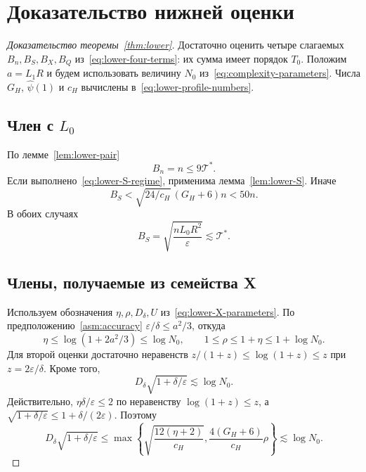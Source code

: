 \section{Доказательство нижней оценки}\label{app:lower-constants}

\begin{proof}[Доказательство теоремы~\ref{thm:lower}]
Достаточно оценить четыре слагаемых $B_n,B_S,B_X,B_Q$
из~\eqref{eq:lower-four-terms}: их сумма имеет порядок $T_0$.
Положим $a=L_1R$ и будем использовать величину $N_0$ из~\eqref{eq:complexity-parameters}.
Числа $G_H$, $\widehat\psi(1)$ и $c_H$ вычислены
в~\eqref{eq:lower-profile-numbers}.

\subsection{Член с \texorpdfstring{$L_0$}{L0}}
По лемме~\ref{lem:lower-pair}
\begin{equation}\label{eq:lower-n-number}
 B_n=n\le9\mathcal T^\ast.
\end{equation}
Если выполнено~\eqref{eq:lower-S-regime}, применима
лемма~\ref{lem:lower-S}. Иначе
\[
 B_S<\sqrt{24/c_H}\,(G_H+6)n<50n.
\]
В обоих случаях
\begin{equation}\label{eq:lower-S-number}
 B_S=\sqrt{\frac{nL_0R^2}{\varepsilon}}\lesssim\mathcal T^\ast.
\end{equation}

\subsection{Члены, получаемые из семейства X}
Используем обозначения $\eta,\rho,D_\delta,U$ из~\eqref{eq:lower-X-parameters}.
По предположению~\ref{asm:accuracy}
$\varepsilon/\delta\le a^2/3$, откуда
\begin{equation}\label{eq:lower-rho-number}
 \eta\le\log(1+2a^2/3)\le\log N_0,\qquad
 1\le\rho\le1+\eta\le1+\log N_0.
\end{equation}
Для второй оценки достаточно неравенств
$z/(1+z)\le\log(1+z)\le z$ при $z=2\varepsilon/\delta$.
Кроме того,
\begin{equation}\label{eq:lower-D-bound}
 D_\delta\sqrt{1+\delta/\varepsilon}\lesssim\log N_0.
\end{equation}
Действительно, $\eta\delta/\varepsilon\le2$ по неравенству
$\log(1+z)\le z$, а
$\sqrt{1+\delta/\varepsilon}\le1+\delta/(2\varepsilon)$. Поэтому
\[
 D_\delta\sqrt{1+\delta/\varepsilon}
 \le\max\left\{\sqrt{\frac{12(\eta+2)}{c_H}},
                 \frac{4(G_H+6)}{c_H}\rho\right\}
 \lesssim\log N_0.
\]


\end{proof}
